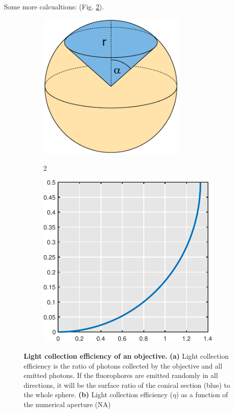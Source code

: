\documentclass{diploma_style}
\begin{document}
Some more calcualtions: (Fig. \ref{fig:light_effb}).

\begin{figure}[tpb]
\begin{subfigure}[t]{0.49\textwidth}
	\centering
	\includegraphics[page=1,width=0.8\textwidth]{figures/2_DualMouse/efficiency/sphere}
	\caption{\textbf{}}
	\label{fig:light_effa}2
\end{subfigure}
\begin{subfigure}[t]{0.49\textwidth}
	\centering
	\includegraphics[page=1,width=1\textwidth]{figures/2_DualMouse/efficiency/light_eff}
	\caption{\textbf{}}
	\label{fig:light_effb}
\end{subfigure} 
 \caption{\textbf{Light collection efficiency of an objective.} \textbf{(a)} Light collection efficiency is the ratio of photons collected by the objective and all emitted photons. If the fluorophores are emitted randomly in all directions, it will be the surface ratio of the conical section (blue) to the whole sphere. \textbf{(b)} Light collection efficiency ($\eta$) as a function of the numerical aperture (NA)}
 \label{fig:light_eff}
\end{figure}
\end{document}

